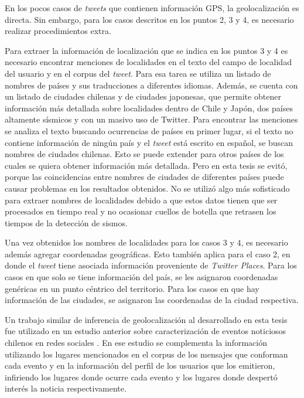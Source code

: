 En los pocos casos de \textit{tweets} que contienen información GPS, la geolocalización es directa. 
%
Sin embargo, para los casos descritos en los puntos 2, 3 y 4, es necesario realizar procedimientos extra. 


Para extraer la información de localización que se indica en los puntos 3 y 4 es necesario encontrar menciones de localidades en el texto del campo de localidad del usuario y en el corpus del \textit{tweet}.  
%
Para esa tarea se utiliza un listado de nombres de países y sus traducciones a diferentes idiomas. 
%
Además, se cuenta con un listado de ciudades chilenas y de ciudades japonesas, que permite obtener información más detallada sobre localidades dentro de Chile y Japón, dos países altamente sísmicos y con un masivo uso de Twitter. 
%
Para encontrar las menciones se analiza el texto buscando ocurrencias de países en primer lugar, si el texto no contiene información de ningún país y el \textit{tweet} está escrito en español, se buscan nombres de ciudades chilenas. %
%
Esto se puede extender para otros países de los cuales se quiera obtener información más detallada. Pero en esta tesis se evitó, porque las coincidencias entre nombres de ciudades de diferentes países puede causar problemas en los resultados obtenidos. 
%
No se utilizó algo más sofisticado para extraer nombres de localidades debido a que estos datos tienen que ser procesados en tiempo real y no ocasionar cuellos de botella que retrasen los tiempos de la detección de sismos.

	
Una vez obtenidos los nombres de localidades para los casos 3 y 4, es necesario además agregar coordenadas geográficas.
%
Esto también aplica para el caso 2, en donde el \textit{tweet} tiene asociada información proveniente de \textit{Twitter Places}.
%
Para los casos en que solo se tiene información del país, se les asignaron coordenadas genéricas en un punto céntrico del territorio. 
%
Para los casos en que hay información de las ciudades, se asignaron las coordenadas de la ciudad respectiva. 


Un trabajo similar de inferencia de geolocalización al desarrollado en esta tesis fue utilizado en un estudio anterior sobre caracterización de eventos noticiosos chilenos en redes sociales \cite{maldonado2015spatio}. En ese estudio se complementa la información utilizando los lugares mencionados en el corpus de los mensajes que conforman cada evento y en la información del perfil de los usuarios que los emitieron, infiriendo los lugares donde ocurre cada evento y los lugares donde despertó interés la noticia respectivamente.

